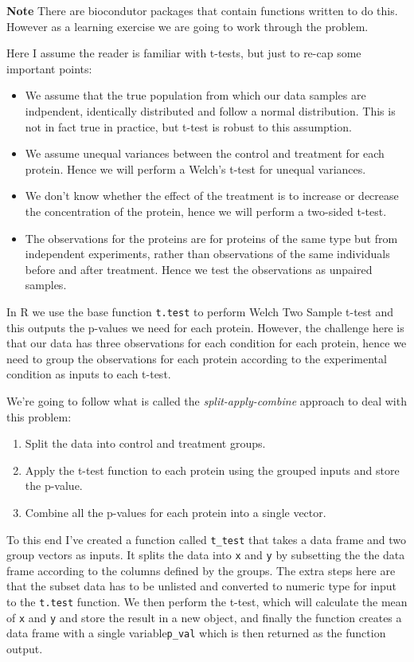\documentclass[12pt,]{book}
\providecommand{\tightlist}{%
  \setlength{\itemsep}{0pt}\setlength{\parskip}{0pt}}
\begin{document}
\textbf{Note} There are biocondutor packages that contain functions written to do
this. However as a learning exercise we are going to work through the problem.

Here I assume the reader is familiar with t-tests, but just to re-cap some
important points:

\begin{itemize}
\item
  We assume that the true population from which our data samples are
  indpendent, identically distributed and follow a normal distribution. This is
  not in fact true in practice, but t-test is robust to this assumption.
\item
  We assume unequal variances between the control and treatment for each protein. Hence we will perform a Welch's t-test for unequal variances.
\item
  We don't know whether the effect of the treatment is to increase or decrease
  the concentration of the protein, hence we will perform a two-sided t-test.
\item
  The observations for the proteins are for proteins of the same type but from
  independent experiments, rather than observations of the same individuals
  before and after treatment. Hence we test the observations as unpaired samples.
\end{itemize}

In R we use the base function \texttt{t.test} to perform Welch Two Sample t-test and
this outputs the p-values we need for each protein. However, the challenge here
is that our data has three observations for each condition for each protein,
hence we need to group the observations for each protein according to the
experimental condition as inputs to each t-test.

We're going to follow what is called the \emph{split-apply-combine} approach to deal
with this problem:

\begin{enumerate}
\def\labelenumi{\arabic{enumi}.}
\tightlist
\item
  Split the data into control and treatment groups.
\item
  Apply the t-test function to each protein using the grouped inputs and
  store the p-value.
\item
  Combine all the p-values for each protein into a single vector.
\end{enumerate}

To this end I've created a function called \texttt{t\_test} that takes a data frame
and two group vectors as inputs. It splits the data into \texttt{x} and \texttt{y} by
subsetting the the data frame according to the columns defined by the groups.
The extra steps here are that the subset data has to be unlisted and converted
to numeric type for input to the \texttt{t.test} function. We then perform the t-test,
which will calculate the mean of \texttt{x} and \texttt{y} and store the result in a new
object, and finally the function creates a data frame with a single variable\texttt{p\_val} which is then returned as the function output.
\end{document}
